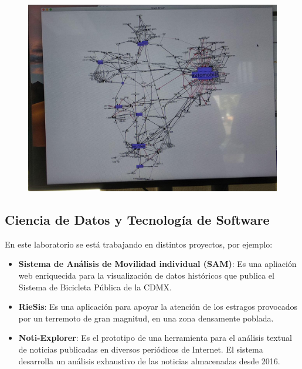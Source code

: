 \documentclass[11pt,letterpaper]{article}
\begin{document}
\begin{figure}[H]
	\centering
	\includegraphics[scale = 0.4]{images/pln}
\end{figure}

\subsection*{Ciencia de Datos y Tecnología de Software}

En este laboratorio se está trabajando en distintos proyectos, por ejemplo:
\begin{itemize}
	\item \textbf{Sistema de Análisis de Movilidad individual (SAM)}: Es una apliación web enriquecida para la visualización de datos históricos que publica el Sistema de Bicicleta Pública de la CDMX.
	\item \textbf{RieSis}: Es una aplicación para apoyar la atención de los estragos provocados por un terremoto de gran magnitud, en una zona densamente poblada.
	\item \textbf{Noti-Explorer}: Es el prototipo de una herramienta para el análisis textual de noticias publicadas en diversos periódicos de Internet. El sistema desarrolla un análisis exhaustivo de las noticias almacenadas desde 2016.
\end{itemize}
\end{document}
